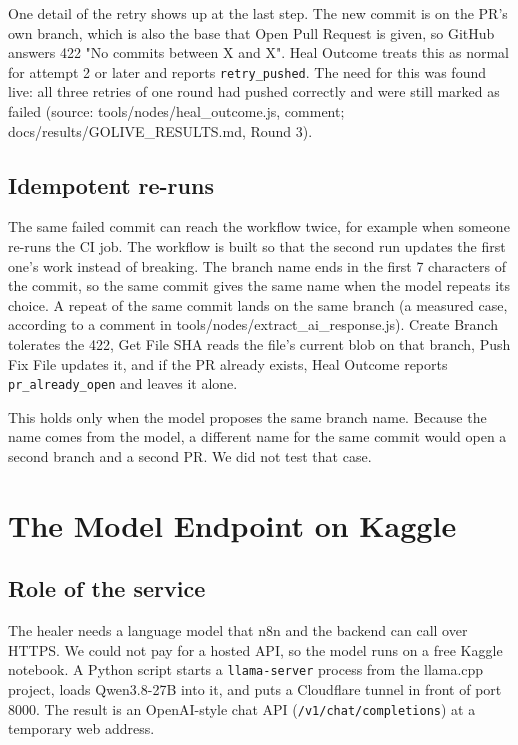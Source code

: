 \documentclass[11pt,a4paper]{report}
\begin{document}
One detail of the retry shows up at the last step. The new commit is on the PR's own branch, which is also the base that Open Pull Request is given, so GitHub answers 422 "No commits between X and X". Heal Outcome treats this as normal for attempt 2 or later and reports \texttt{retry\_\allowbreak{}pushed}. The need for this was found live: all three retries of one round had pushed correctly and were still marked as failed (source: tools/nodes/heal\_outcome.js, comment; docs/results/GOLIVE\_RESULTS.md, Round 3).

\section{Idempotent re-runs}

The same failed commit can reach the workflow twice, for example when someone re-runs the CI job. The workflow is built so that the second run updates the first one's work instead of breaking. The branch name ends in the first 7 characters of the commit, so the same commit gives the same name when the model repeats its choice. A repeat of the same commit lands on the same branch (a measured case, according to a comment in tools/nodes/extract\_ai\_response.js). Create Branch tolerates the 422, Get File SHA reads the file's current blob on that branch, Push Fix File updates it, and if the PR already exists, Heal Outcome reports \texttt{pr\_\allowbreak{}already\_\allowbreak{}open} and leaves it alone.

This holds only when the model proposes the same branch name. Because the name comes from the model, a different name for the same commit would open a second branch and a second PR. We did not test that case.

\chapter{The Model Endpoint on Kaggle}

\section{Role of the service}

The healer needs a language model that n8n and the backend can call over HTTPS. We could not pay for a hosted API, so the model runs on a free Kaggle notebook. A Python script starts a \texttt{llama-\allowbreak{}server} process from the llama.cpp project, loads Qwen3.8-27B into it, and puts a Cloudflare tunnel in front of port 8000. The result is an OpenAI-style chat API (\texttt{/\allowbreak{}v1/\allowbreak{}chat/\allowbreak{}completions}) at a temporary web address.
\end{document}
